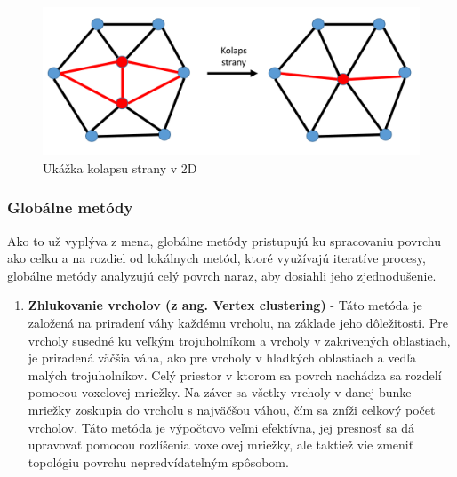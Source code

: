 \begin{enumerate}
    \begin{figure}[!htbp]
      \centering
      \includegraphics[width=12 cm]{img/edge_collapse.png}
      \caption{Ukážka kolapsu strany v 2D} 
      \label{fig:Edge_collapse}
    \end{figure} 
\end{enumerate}

\subsubsection{Globálne metódy}
\noindent Ako to už vyplýva z mena, globálne metódy pristupujú ku spracovaniu povrchu ako celku a na rozdiel od lokálnych metód, ktoré využívajú iteratíve procesy, globálne metódy analyzujú celý povrch naraz, aby dosiahli jeho zjednodušenie.
\begin{enumerate}
    \item\textbf{Zhlukovanie vrcholov (z ang. Vertex clustering)} - Táto metóda je založená na priradení váhy každému vrcholu, na základe jeho dôležitosti. Pre vrcholy susedné ku veľkým trojuholníkom a vrcholy v zakrivených oblastiach, je priradená väčšia váha, ako pre vrcholy v hladkých oblastiach a vedľa malých trojuholníkov. Celý priestor v ktorom sa povrch nachádza sa rozdelí pomocou voxelovej mriežky. Na záver sa všetky vrcholy v danej bunke mriežky zoskupia do vrcholu s najväčšou váhou, čím sa zníži celkový počet vrcholov. Táto metóda je výpočtovo veľmi efektívna, jej presnosť sa dá upravovať pomocou rozlíšenia voxelovej mriežky, ale taktiež vie zmeniť topológiu povrchu nepredvídateľným spôsobom. \cite{mesh_simplification}
\end{enumerate}

